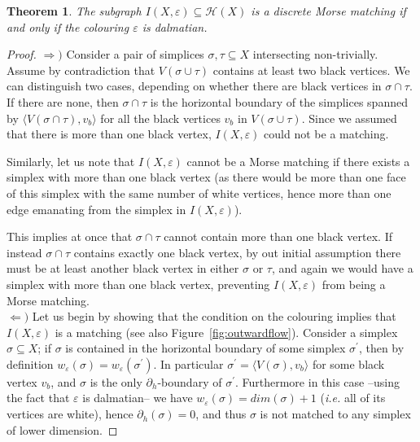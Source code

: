 \documentclass[11pt, a4paper, reqno, twoside, makeidx]{amsart}
\theoremstyle{remark}
\theoremstyle{plain}
\newtheorem{thm}{Theorem}[section]
\theoremstyle{definition}
\newcommand{\hasse}{\mathcal{H}(X)}
\begin{document}
\begin{thm}\label{thm:dmmandsubgraphs}
The subgraph $I(X,\varepsilon) \subseteq \hasse$ is a discrete Morse matching if and only if the colouring $\varepsilon$ is dalmatian.
\end{thm}
\begin{proof}
$\Longrightarrow )$ Consider a pair of simplices $\sigma, \tau \subseteq X$ intersecting non-trivially. Assume by contradiction that $V(\sigma \cup \tau)$ contains at least two black vertices. We can distinguish two cases, depending on whether there are black vertices in $\sigma \cap \tau$. If there are none, then $\sigma \cap \tau$ is the horizontal boundary of the simplices spanned by $\langle V(\sigma \cap \tau) , v_b\rangle$ for all the black vertices $v_b$ in $V(\sigma \cup \tau)$. Since we assumed that there is more than one black vertex, $I(X,\varepsilon)$ could not be a matching.

Similarly, let us note that $I(X,\varepsilon)$ cannot be a Morse matching if there exists a simplex with more than one black vertex (as there would be more than one face of this simplex with the same number of white vertices, hence more than one edge emanating from the simplex in $I(X, \varepsilon)$).  

This implies at once that $\sigma \cap \tau$ cannot contain more than one black vertex. If instead $\sigma \cap \tau$ contains exactly one black vertex, by out initial assumption there must be at least another black vertex in either $\sigma$ or $\tau$, and again we would have a simplex with more than one black vertex, preventing $I(X, \varepsilon)$ from being a Morse matching.
~\\

$\Longleftarrow )$ Let us begin by showing that the condition on the colouring implies that $I(X, \varepsilon)$ is a matching (see also Figure~\ref{fig:outwardflow}). Consider a simplex $\sigma \subseteq X$; if $\sigma$ is contained in the horizontal boundary of some simplex $\sigma^\prime$, then by definition $w_\varepsilon (\sigma) = w_\varepsilon (\sigma^\prime)$. In particular $\sigma^\prime = \langle V(\sigma) , v_b\rangle$ for some black vertex $v_b$, and $\sigma$ is the only $\partial_h$-boundary of $\sigma^\prime$. 
Furthermore in this case --using the fact that $\varepsilon$ is dalmatian-- we have $w_\varepsilon (\sigma) = dim(\sigma) +1$ (\emph{i.e.} all of its vertices are white), hence $\partial_h (\sigma) =0$, and thus $\sigma$ is not matched to any simplex of lower dimension.


\end{proof}
\end{document}
